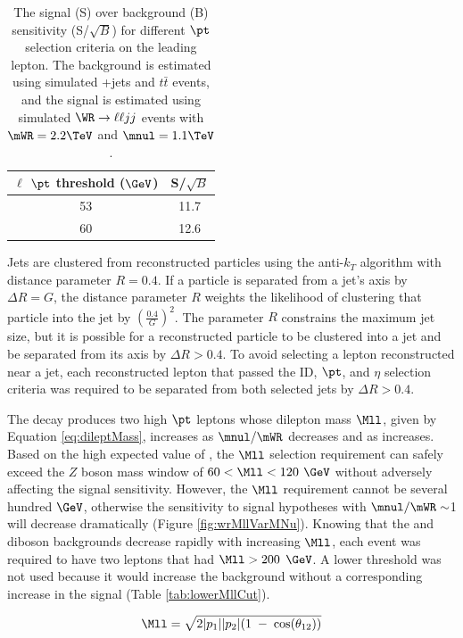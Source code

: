 \begin{table}[h]
	\caption{The signal (S) over background (B) sensitivity (S/$\sqrt{B}$) for different $\pt$ selection 
		criteria on the leading lepton.  The background is estimated using simulated \DY+jets and $t\bar{t}$ events, and the 
		signal is estimated using simulated $\WR \rightarrow \ell\ell jj$ events with $\mWR = 2.2 \TeV$ and $\mnul = 1.1 \TeV$.}
	\label{tab:lowerLeptPtCut}
	\centering
	\begin{tabular}{c|c}
		$\ell$ $\pt$ threshold ($\GeV$) & S/$\sqrt{B}$ \\  \hline
		53 &  11.7  \\
		60 &  12.6  \\ \hline
	\end{tabular}
\end{table}
\clearpage

Jets are clustered from reconstructed particles using the anti-$k_{T}$ algorithm with distance parameter $R = 0.4$.  If a particle is 
separated from a jet's axis by $\Delta R = G$, the distance parameter $R$ weights the likelihood of clustering that particle into the 
jet by $(\frac{0.4}{G})^{2}$.  The parameter $R$ constrains the maximum jet size, but it is possible for a reconstructed particle to be 
clustered into a jet and be separated from its axis by $\Delta R > 0.4$.  To avoid selecting a lepton reconstructed near a jet, each 
reconstructed lepton that passed the ID, $\pt$, and $\eta$ selection criteria was required to be separated from both selected jets by 
$\Delta R > 0.4$.

The \WR decay produces two high $\pt$ leptons whose dilepton mass $\Mll$, given by Equation \ref{eq:dileptMass}, increases as $\mnul/\mWR$ 
decreases and as \mWR increases.  Based on the high expected value of \mWR, the $\Mll$ selection requirement can safely exceed the $Z$ boson 
mass window of $60 < \Mll < 120$ $\GeV$ without adversely affecting the signal sensitivity.  However, the $\Mll$ requirement cannot be several 
hundred $\GeV$, otherwise the sensitivity to signal hypotheses with $\mnul/\mWR \sim$1 will decrease dramatically (Figure \ref{fig:wrMllVarMNu}).  
Knowing that the \DY and diboson backgrounds decrease rapidly with increasing $\Mll$, each event was required to have two leptons that had 
$\Mll > 200$ $\GeV$.  A lower threshold was not used because it would increase the background without a corresponding increase in the signal 
(Table \ref{tab:lowerMllCut}).

\begin{equation}
	\Mll = \sqrt{2|p_{1}||p_{2}|(1\thickspace - \thickspace \cos(\theta_{12}))}
	\label{eq:dileptMass}
\end{equation}

